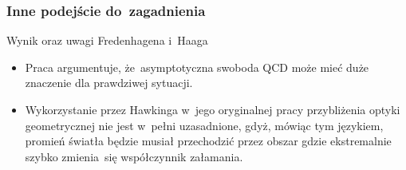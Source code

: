 \documentclass{beamer}  %
\begin{document}
\begin{frame}
  \frametitle{Inne podejście do~zagadnienia}

  \begin{block}{Wynik oraz uwagi Fredenhagena i~Haaga}
    \begin{itemize}
    \item Praca argumentuje, że~asymptotyczna swoboda QCD może mieć
      duże znaczenie dla prawdziwej sytuacji.
    \item Wykorzystanie przez Hawkinga w~jego oryginalnej pracy
      przybliżenia optyki geometrycznej nie jest w~pełni uzasadnione,
      gdyż, mówiąc tym językiem, promień światła będzie musiał
      przechodzić przez obszar gdzie ekstremalnie szybko zmienia~się
      współczynnik załamania.
    \end{itemize}
  \end{block}


\end{frame}






\end{document}
